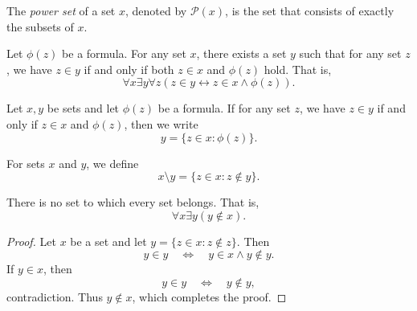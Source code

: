 \begin{definition}
  The \emph{power set} of a set $x$, denoted by $\mathcal{P}(x)$, is the set
  that consists of exactly the subsets of $x$.
\end{definition}

\begin{axiom}
  Let $\phi(z)$ be a formula.
  For any set $x$, there exists a set $y$ such that for any set $z$, we have
  $z \in y$ if and only if both $z \in x$ and $\phi(z)$ hold.
  That is,
  \begin{equation*}
    \forall x \exists y \forall z (z \in y \leftrightarrow z \in x \wedge
    \phi(z)).
  \end{equation*}
\end{axiom}

\begin{definition}
  Let $x, y$ be sets and let $\phi(z)$ be a formula.
  If for any set $z$, we have $z \in y$ if and only if $z \in x$ and $\phi(z)$,
  then we write
  \begin{equation*}
    y = \{z \in x: \phi(z)\}.
  \end{equation*}
\end{definition}

\begin{definition}
  For sets $x$ and $y$, we define
  \begin{equation*}
    x \setminus y = \{z \in x: z \notin y\}.
  \end{equation*}
\end{definition}

\begin{theorem}
  There is no set to which every set belongs.
  That is,
  \begin{equation*}
    \forall x \exists y (y \notin x).
  \end{equation*}
\end{theorem}
\begin{proof}
  Let $x$ be a set and let $y = \{z \in x: z \notin z\}$.
  Then
  \begin{equation*}
    y \in y
    \quad \Leftrightarrow \quad
    y \in x \wedge y \notin y.
  \end{equation*}
  If $y \in x$, then
  \begin{equation*}
    y \in y \quad \Leftrightarrow \quad y \notin y,
  \end{equation*}
  contradiction.
  Thus $y \notin x$, which completes the proof.
\end{proof}

